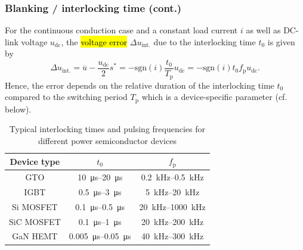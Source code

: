 \begin{frame}
    \frametitle{Blanking / interlocking time (cont.)}
    For the continuous conduction case and a constant load current $i$ as well as DC-link voltage $u_\mathrm{dc}$, the \hl{voltage error} $\Delta u_\mathrm{int.}$ due to the interlocking time $t_0$ is given by
    \begin{equation}
        \Delta u_\mathrm{int.} =\overline{u} - \frac{u_\mathrm{dc}}{2}s^* = -\mathrm{sgn}(i)\frac{t_0}{T_\mathrm{p}}  u_\mathrm{dc}= -\mathrm{sgn}(i)t_0 f_\mathrm{p} u_\mathrm{dc}.
    \end{equation}
    \pause
    Hence, the error depends on the relative duration of the interlocking time $t_0$ compared to the switching period $T_\mathrm{p}$ which is a device-specific parameter (cf. below).

    \begin{table}
        \begin{tabular}{c c c}
            \toprule
            Device type & $t_0$                                & $f_\mathrm{p}$                  \\
            \midrule
            GTO         & \SIrange{10}{20}{\micro\second}      & \SIrange{0.2}{0.5}{\kilo\hertz} \\
            IGBT        & \SIrange{0.5}{3}{\micro\second}      & \SIrange{5}{20}{\kilo\hertz}    \\
            Si MOSFET   & \SIrange{0.1}{0.5}{\micro\second}    & \SIrange{20}{1000}{\kilo\hertz} \\
            SiC MOSFET  & \SIrange{0.1}{1}{\micro\second}      & \SIrange{20}{200}{\kilo\hertz}  \\
            GaN HEMT    & \SIrange{0.005}{0.05}{\micro\second} & \SIrange{40}{300}{\kilo\hertz}  \\
            \bottomrule
        \end{tabular}
        \caption{Typical interlocking times and pulsing frequencies for different power semiconductor devices}
        \label{tab:interlocking_times}
    \end{table}
\end{frame}



